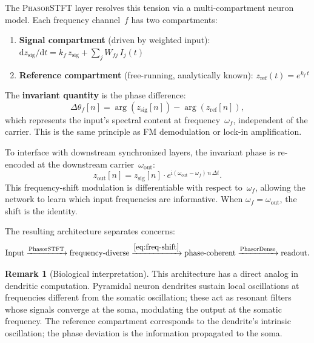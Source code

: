 \documentclass[11pt]{article}
\newcommand{\im}{\mathrm{i}}
\newcommand{\dd}{\mathrm{d}}
\newcommand{\dt}{\Delta t}
\theoremstyle{definition}
\newtheorem{remark}{Remark}
\begin{document}
The \textsc{PhasorSTFT} layer resolves this tension via a multi-compartment
neuron model. Each frequency channel~$f$ has two compartments:

\begin{enumerate}[nosep]
  \item \textbf{Signal compartment} (driven by weighted input):
    \(
      \dd z_{\text{sig}}/\dd t
        = k_f\,z_{\text{sig}} + \sum_j W_{fj}\,I_j(t)
    \)
  \item \textbf{Reference compartment} (free-running, analytically known):
    \(
      z_{\text{ref}}(t) = e^{k_f\,t}
    \)
\end{enumerate}

The \textbf{invariant quantity} is the phase difference:
\begin{equation}
  \Delta\theta_f[n]
    = \arg(z_{\text{sig}}[n]) - \arg(z_{\text{ref}}[n]),
\end{equation}
which represents the input's spectral content at frequency~$\omega_f$,
independent of the carrier. This is the same principle as FM demodulation
or lock-in amplification.

To interface with downstream synchronized layers, the invariant phase is
re-encoded at the downstream carrier~$\omega_{\text{out}}$:
\begin{equation}\label{eq:freq-shift}
  z_{\text{out}}[n]
    = z_{\text{sig}}[n]
    \cdot e^{\im(\omega_{\text{out}} - \omega_f)\,n\,\dt}.
\end{equation}
This frequency-shift modulation is differentiable with respect
to~$\omega_f$, allowing the network to learn which input frequencies are
informative. When $\omega_f = \omega_{\text{out}}$, the shift is the
identity.

The resulting architecture separates concerns:
\begin{equation}
  \text{Input}
    \xrightarrow{\text{PhasorSTFT}}
  \text{frequency-diverse}
    \xrightarrow{\eqref{eq:freq-shift}}
  \text{phase-coherent}
    \xrightarrow{\text{PhasorDense}}
  \text{readout}.
\end{equation}

\begin{remark}[Biological interpretation]
This architecture has a direct analog in dendritic computation.
Pyramidal neuron dendrites sustain local oscillations at frequencies
different from the somatic oscillation; these act as resonant filters
whose signals converge at the soma, modulating the output at the somatic
frequency. The reference compartment corresponds to the dendrite's
intrinsic oscillation; the phase deviation is the information
propagated to the soma.
\end{remark}
\end{document}
